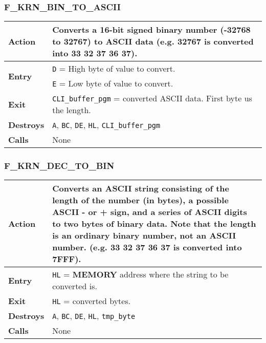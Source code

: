 \documentclass[a4paper,11pt]{article}
\begin{document}
        \subsubsection{F\_KRN\_BIN\_TO\_ASCII}
        \label{func:fkrnbintoascii}
        \begin{tabular}{l p{9cm}}
            \hline\textbf{Action}
            & Converts a 16-bit signed binary number (-32768 to 32767) to ASCII
            data (e.g. 32767 is converted into 33 32 37 36 37).\\
            \hline\multirow[t]{2}{4em}{\textbf{Entry}}
            & \texttt{D} = High byte of value to convert.\\
            & \texttt{E} = Low byte of value to convert.\\
            \hline\textbf{Exit} & \texttt{CLI\_buffer\_pgm} = converted ASCII data.
            First byte us the length.\\
            \hline\textbf{Destroys} & \texttt{A}, \texttt{BC}, \texttt{DE}, 
            \texttt{HL}, \texttt{CLI\_buffer\_pgm}\\
            \hline\textbf{Calls} & None\\
            \hline
        \end{tabular}

        \subsubsection{F\_KRN\_DEC\_TO\_BIN}
        \label{func:fkrndectobin}
        \begin{tabular}{l p{9cm}}
            \hline\textbf{Action}
            & Converts an ASCII string consisting of the length of the number
            (in bytes), a possible ASCII - or + sign, and a series of ASCII
            digits to two bytes of binary data. Note that the length is an
            ordinary binary number, not an ASCII number. (e.g. 33 32 37 36 37 is
            converted into 7FFF).\\
            \hline\textbf{Entry} & \texttt{HL} = \textbf{MEMORY} address where
            the string to be converted is.\\
            \hline\textbf{Exit} & \texttt{HL} = converted bytes.\\
            \hline\textbf{Destroys} & \texttt{A}, \texttt{BC}, \texttt{DE}, 
            \texttt{HL}, \texttt{tmp\_byte}\\
            \hline\textbf{Calls} & None\\
            \hline
        \end{tabular}
\end{document}
